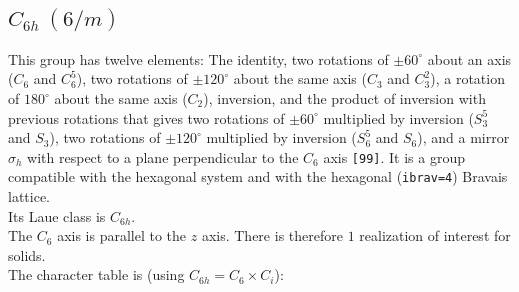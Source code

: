 \documentclass[12pt,a4paper]{article}
\begin{document}
\newpage
\subsection{\color{web-blue}$C_{6h}\ (6/m)$}  
This group has twelve elements: The identity, two rotations of $\pm60^\circ$ 
about an axis ($C_6$ and $C_6^5$), two rotations of $\pm120^\circ$
about the same axis ($C_3$ and $C_3^2$), a rotation of $180^\circ$ about the
same axis ($C_2$), inversion, and the product of inversion with previous
rotations that gives two rotations of $\pm60^\circ$ multiplied by inversion
($S_3^5$ and $S_3$), two rotations of $\pm120^\circ$ multiplied 
by inversion ($S_6^5$ and $S_6$), and a mirror $\sigma_h$
with respect to a plane perpendicular to the $C_6$ axis \texttt{[99]}. 
It is a group compatible with the hexagonal system and with the  
hexagonal (\texttt{ibrav=4}) Bravais lattice. \\ 
Its Laue class is $C_{6h}$. \\
The $C_6$ axis is parallel to the $z$ axis. There is therefore
$1$ realization of interest for solids. \\
The character table is (using $C_{6h}=C_6 \times C_i$):
\end{document}
